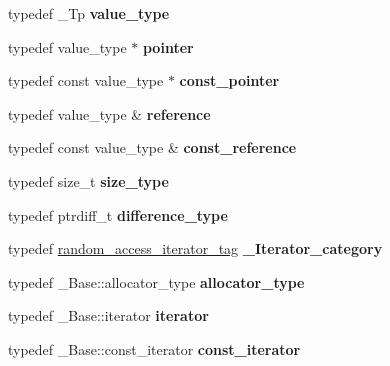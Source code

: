\begin{DoxyCompactItemize}
\item 
\mbox{\label{classdeque_a4beaa2826510a15103b4e01d1faa31df}} 
typedef \+\_\+\+Tp {\bfseries value\+\_\+type}
\item 
\mbox{\label{classdeque_a6101907d1272b65463cc77121e94bef6}} 
typedef value\+\_\+type $\ast$ {\bfseries pointer}
\item 
\mbox{\label{classdeque_abe3f48b8db12ae2d2e1c8b732e3563b5}} 
typedef const value\+\_\+type $\ast$ {\bfseries const\+\_\+pointer}
\item 
\mbox{\label{classdeque_a5763152ecaa38821b1dfb96f57964d22}} 
typedef value\+\_\+type \& {\bfseries reference}
\item 
\mbox{\label{classdeque_a9be701298b98770dcf6e04597fdde160}} 
typedef const value\+\_\+type \& {\bfseries const\+\_\+reference}
\item 
\mbox{\label{classdeque_a78fc9a20c7832fb52ecb94ed854b00dd}} 
typedef size\+\_\+t {\bfseries size\+\_\+type}
\item 
\mbox{\label{classdeque_aa0a0ce4ae8792f5e47bb17bbf8c01e80}} 
typedef ptrdiff\+\_\+t {\bfseries difference\+\_\+type}
\item 
\mbox{\label{classdeque_af1427a66623140cd21ce1754e732eae0}} 
typedef \hyperlink{structrandom__access__iterator__tag}{random\+\_\+access\+\_\+iterator\+\_\+tag} {\bfseries \+\_\+\+Iterator\+\_\+category}
\item 
\mbox{\label{classdeque_a990af1c421099a2454ee6ad80e728573}} 
typedef \+\_\+\+Base\+::allocator\+\_\+type {\bfseries allocator\+\_\+type}
\item 
\mbox{\label{classdeque_a374bb507398b383b9414618b6e106249}} 
typedef \+\_\+\+Base\+::iterator {\bfseries iterator}
\item 
\mbox{\label{classdeque_a630e623af9631fae4c878b9bc32279a4}} 
typedef \+\_\+\+Base\+::const\+\_\+iterator {\bfseries const\+\_\+iterator}

\end{DoxyCompactItemize}
